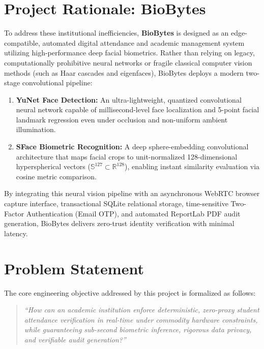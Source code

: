 \section{Project Rationale: BioBytes}
To address these institutional inefficiencies, \textbf{BioBytes} is designed as an edge-compatible, automated digital attendance and academic management system utilizing high-performance deep facial biometrics. Rather than relying on legacy, computationally prohibitive neural networks or fragile classical computer vision methods (such as Haar cascades and eigenfaces), BioBytes deploys a modern two-stage convolutional pipeline:
\begin{enumerate}
    \item \textbf{YuNet Face Detection:} An ultra-lightweight, quantized convolutional neural network capable of millisecond-level face localization and 5-point facial landmark regression even under occlusion and non-uniform ambient illumination.
    \item \textbf{SFace Biometric Recognition:} A deep sphere-embedding convolutional architecture that maps facial crops to unit-normalized 128-dimensional hyperspherical vectors ($\mathbb{S}^{127} \subset \mathbb{R}^{128}$), enabling instant similarity evaluation via cosine metric comparison.
\end{enumerate}

By integrating this neural vision pipeline with an asynchronous WebRTC browser capture interface, transactional SQLite relational storage, time-sensitive Two-Factor Authentication (Email OTP), and automated ReportLab PDF audit generation, BioBytes delivers zero-trust identity verification with minimal latency.

\section{Problem Statement}
The core engineering objective addressed by this project is formalized as follows:
\begin{quote}
\textit{``How can an academic institution enforce deterministic, zero-proxy student attendance verification in real-time under commodity hardware constraints, while guaranteeing sub-second biometric inference, rigorous data privacy, and verifiable audit generation?''}
\end{quote}

